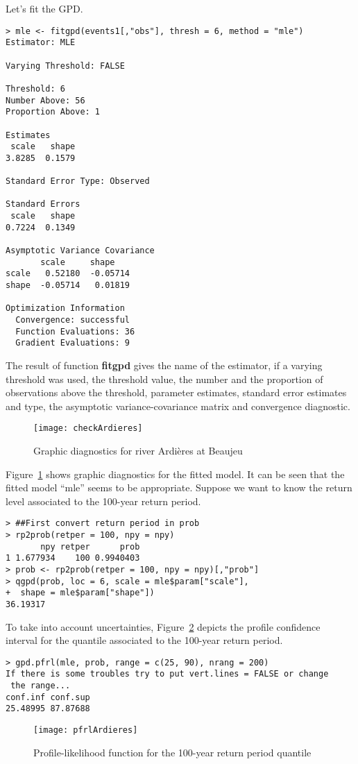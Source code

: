 \documentclass[11pt,a4paper]{article}
\numberwithin{equation}{section}
\theoremstyle{definition}
\begin{document}
Let's fit the GPD.
\begin{verbatim}
> mle <- fitgpd(events1[,"obs"], thresh = 6, method = "mle")
Estimator: MLE 

Varying Threshold: FALSE 

Threshold: 6 
Number Above: 56 
Proportion Above: 1 

Estimates
 scale   shape  
3.8285  0.1579  

Standard Error Type: Observed 

Standard Errors
 scale   shape  
0.7224  0.1349  

Asymptotic Variance Covariance
       scale     shape   
scale   0.52180  -0.05714
shape  -0.05714   0.01819

Optimization Information
  Convergence: successful 
  Function Evaluations: 36 
  Gradient Evaluations: 9 
\end{verbatim}
The result of function \textbf{fitgpd} gives the name of the
estimator, if a varying threshold was used, the threshold value, the
number and the proportion of observations above the threshold,
parameter estimates, standard error estimates and type, the asymptotic
variance-covariance matrix and convergence diagnostic.

\begin{figure}
  \centering
  \texttt{[image: checkArdieres]}
  \caption{Graphic diagnostics for river Ardi\`eres at Beaujeu}
  \label{fig:checkArdieres}
\end{figure}

Figure~\ref{fig:checkArdieres} shows graphic diagnostics for the
fitted model. It can be seen that the fitted model ``mle'' seems to be
appropriate. Suppose we want to know the return level associated to
the 100-year return period.
\begin{verbatim}
> ##First convert return period in prob
> rp2prob(retper = 100, npy = npy)
       npy retper      prob
1 1.677934    100 0.9940403
> prob <- rp2prob(retper = 100, npy = npy)[,"prob"]
> qgpd(prob, loc = 6, scale = mle$param["scale"],
+  shape = mle$param["shape"])
36.19317 
\end{verbatim}


To take into account uncertainties, Figure~\ref{fig:pfrlArdieres}
depicts the profile confidence interval for the quantile associated to
the 100-year return period.
\begin{verbatim}
> gpd.pfrl(mle, prob, range = c(25, 90), nrang = 200)
If there is some troubles try to put vert.lines = FALSE or change
 the range...
conf.inf conf.sup 
25.48995 87.87688 
\end{verbatim}
\begin{figure}
  \centering
  \texttt{[image: pfrlArdieres]}
  \caption{Profile-likelihood function for the 100-year return period
    quantile} 
  \label{fig:pfrlArdieres}
\end{figure}
\end{document}
